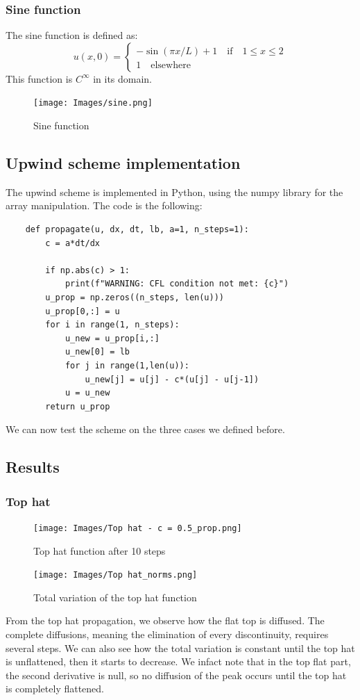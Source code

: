 \documentclass{report}
\begin{document}
\subsubsection*{Sine function}
The sine function is defined as:
\begin{equation*}
    u(x,0) = \begin{cases}
        -\sin(\pi x/L) + 1 \quad \textrm{if} \quad 1 \leq x \leq 2 \\
        1 \quad \textrm{elsewhere}
    \end{cases}
\end{equation*}
This function is $C^{\infty}$ in its domain.
\begin{figure}[H]
    \centering
    \texttt{[image: Images/sine.png]}
    \caption{Sine function}
    \label{fig:sine}
\end{figure}
\subsection*{Upwind scheme implementation}
The upwind scheme is implemented in Python, using the numpy library for the array manipulation. The code is the following:
\begin{verbatim}
    def propagate(u, dx, dt, lb, a=1, n_steps=1):
        c = a*dt/dx

        if np.abs(c) > 1:
            print(f"WARNING: CFL condition not met: {c}")
        u_prop = np.zeros((n_steps, len(u)))
        u_prop[0,:] = u
        for i in range(1, n_steps):
            u_new = u_prop[i,:]
            u_new[0] = lb
            for j in range(1,len(u)):
                u_new[j] = u[j] - c*(u[j] - u[j-1])
            u = u_new
        return u_prop
\end{verbatim}
We can now test the scheme on the three cases we defined before.
\subsection*{Results}
\subsubsection*{Top hat}
\begin{figure}[H]
    \centering
    \texttt{[image: Images/Top hat - c = 0.5\_prop.png]}
    \caption{Top hat function after 10 steps}
    \label{fig:top_hat_res}
\end{figure}

\begin{figure}[H]
    \centering
    \texttt{[image: Images/Top hat\_norms.png]}
    \caption{Total variation of the top hat function}
    \label{fig:top_hat_TV}
\end{figure}
From the top hat propagation, we observe how the flat top is diffused.
The complete diffusions, meaning the elimination of every discontinuity,
requires several steps. We can also see how the total variation is constant
until the top hat is unflattened, then it starts to decrease. We infact note that in the top flat part, the second derivative is null, so no diffusion of the peak
occurs until the top hat is completely flattened.
\end{document}
